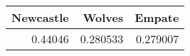 \begin{tabular}{rrr}
\hline
   Newcastle &   Wolves &   Empate \\
\hline
     0.44046 & 0.280533 & 0.279007 \\
\hline
\end{tabular}